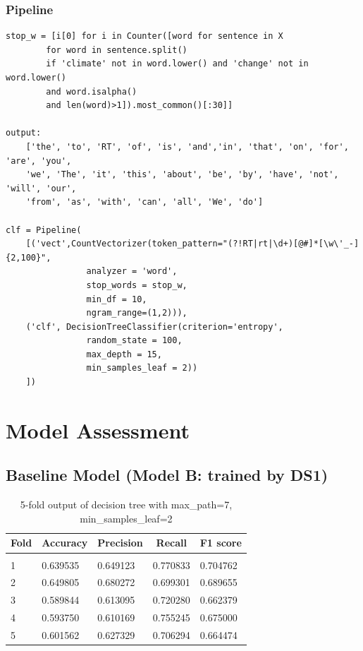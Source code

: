 \documentclass{article} %
\begin{document}
\subsubsection{Pipeline}

\lstset{language=Python}
\lstset{frame=lines}
\lstset{basicstyle=\footnotesize}
\begin{lstlisting}
stop_w = [i[0] for i in Counter([word for sentence in X 
		for word in sentence.split() 
		if 'climate' not in word.lower() and 'change' not in word.lower()
		and word.isalpha() 
		and len(word)>1]).most_common()[:30]]

output: 
	['the', 'to', 'RT', 'of', 'is',	'and','in', 'that', 'on', 'for', 'are',	'you', 
	'we', 'The', 'it', 'this', 'about', 'be', 'by', 'have', 'not', 'will', 'our', 
	'from', 'as', 'with', 'can', 'all', 'We', 'do']

clf = Pipeline(
	[('vect',CountVectorizer(token_pattern="(?!RT|rt|\d+)[@#]*[\w\'_-]{2,100}",
				analyzer = 'word',
				stop_words = stop_w,
				min_df = 10,
				ngram_range=(1,2))),
	('clf', DecisionTreeClassifier(criterion='entropy',
				random_state = 100,
				max_depth = 15,
				min_samples_leaf = 2))
	])
\end{lstlisting}


\section{Model Assessment}

\subsection{Baseline Model (Model B: trained by DS1)}

\begin{table}[H]
	\caption{5-fold output of decision tree with max\_path=7, min\_samples\_leaf=2}
	\label{sample-table}
	\begin{center}
		\begin{tabular}{|l|l|l|l|l|}
			\multicolumn{1}{c}{\bf Fold}  
			&\multicolumn{1}{c}{\bf Accuracy}
			&\multicolumn{1}{c}{\bf Precision} 
			&\multicolumn{1}{c}{\bf Recall}
			&\multicolumn{1}{c}{\bf F1 score}
			\\ \hline & & & & \\
			1	&0.639535	&0.649123	&0.770833	&0.704762 \\
			2	&0.649805	&0.680272	&0.699301	&0.689655 \\
			3	&0.589844	&0.613095	&0.720280	&0.662379 \\ 
			4	&0.593750	&0.610169	&0.755245	&0.675000  \\
			5	&0.601562	&0.627329	&0.706294	&0.664474  \\
			\hline
		\end{tabular}
	\end{center}
\end{table}
\end{document}
